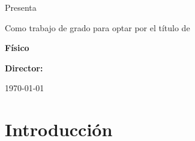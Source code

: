 \AddToShipoutPicture*{\BackgroundPic}
\thispagestyle{empty}
\begin{center}
  \vspace*{1cm}
  {\Huge \textbf{\thetitle} \par}
  \vspace{2cm}
{Presenta 
\large \par \textbf{\theauthor} \par}
  \vspace*{2cm}
 {Como trabajo de grado para optar por el título de \par \textbf{Físico} \par
 \vspace{1cm}
 \large \textbf{Director:} \par \tutor \par}
  \vspace{2cm}
  {\Large \universidad \par}
  \vspace{0.5cm}
  {\large \facultad \par}
  \vspace{0.5cm}
  {\large \lugar \par}
  \vspace{0.5cm}
  {\large \today}
  \vfill
\end{center}


\newpage
\tableofcontents*
\newpage
\listoftables 
\newpage
\listoffigures
\newpage
\chapter{Introducción}
\newpage


\backmatter 
\printbibliography

\newpage
\printindex
